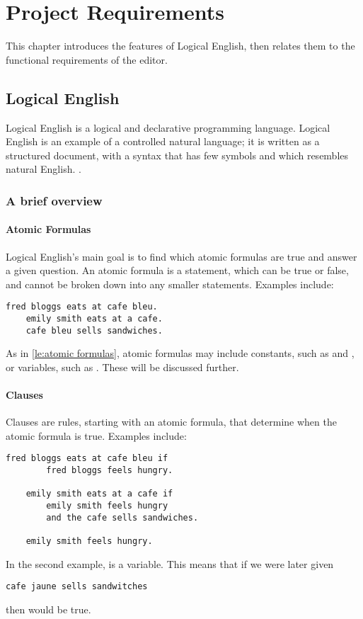 \documentclass[../main.tex]{subfiles}
\begin{document}
\chapter{Project Requirements}
This chapter introduces the features of Logical English, then relates them to the functional requirements of the editor.
\section{Logical English}
Logical English is a logical and declarative programming language. Logical English is an example of a controlled natural language; it is written as a structured document, with a syntax that has few symbols and which resembles natural English. \cite{logical_english}.

\subsection{A brief overview}
\subsubsection{Atomic Formulas}
Logical English's main goal is to find which atomic formulas are true and answer a given question. An atomic formula is a statement, which can be true or false, and cannot be broken down into any smaller statements. Examples include:
\begin{lstlisting}[language={LE},caption={Examples of atomic formulas in Logical English.},label={le:atomic formulas}]
    fred bloggs eats at cafe bleu.
    emily smith eats at a cafe.
    cafe bleu sells sandwiches.
\end{lstlisting}
As in \ref{le:atomic formulas}, atomic formulas may include constants, such as  and , or variables, such as . These will be discussed further.


\subsubsection{Clauses}
Clauses are rules, starting with an atomic formula, that determine when the atomic formula is true. Examples include:
\begin{lstlisting}[language={LE},label={le:clauses}]
    fred bloggs eats at cafe bleu if
        fred bloggs feels hungry.

    emily smith eats at a cafe if
        emily smith feels hungry
        and the cafe sells sandwiches.

    emily smith feels hungry.
\end{lstlisting}
In the second example,  is a variable. This means that if we were later given 
\begin{lstlisting}[language={LE}]
    cafe jaune sells sandwitches
\end{lstlisting}
then  would be true.
\end{document}
